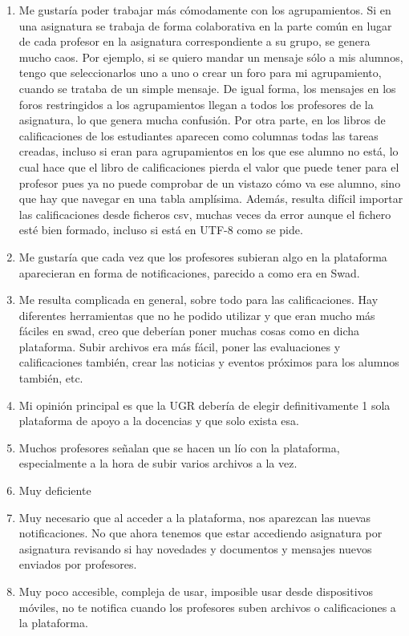 \begin{enumerate}
\item Me gustaría poder trabajar más cómodamente con los agrupamientos. Si en una asignatura se trabaja de forma colaborativa en la parte común en lugar de cada profesor en la asignatura correspondiente a su grupo, se genera mucho caos. Por ejemplo, si se quiero mandar un mensaje sólo a mis alumnos, tengo que seleccionarlos uno a uno o crear un foro para mi agrupamiento, cuando se trataba de un simple mensaje. De igual forma, los mensajes en los foros restringidos a los agrupamientos llegan a todos los profesores de la asignatura, lo que genera mucha confusión. Por otra parte, en los libros de calificaciones de los estudiantes aparecen como columnas todas las tareas creadas, incluso si eran para agrupamientos en los que ese alumno no está, lo cual hace que el libro de calificaciones pierda el valor que puede tener para el profesor pues ya no puede comprobar de un vistazo cómo va ese alumno, sino que hay que navegar en una tabla amplísima. Además, resulta difícil importar las calificaciones desde ficheros csv, muchas veces da error aunque el fichero esté bien formado, incluso si está en UTF-8 como se pide.
\item Me gustaría que cada vez que los profesores subieran algo en la plataforma aparecieran en forma de notificaciones, parecido a como era en Swad.
\item Me resulta complicada en general, sobre todo para las calificaciones. Hay diferentes herramientas que no he podido utilizar y que eran mucho más fáciles en swad, creo que deberían poner muchas cosas como en dicha plataforma. Subir archivos era más fácil, poner las evaluaciones y calificaciones también, crear las noticias y eventos próximos para los alumnos también, etc.
\item Mi opinión principal es que la UGR debería de elegir definitivamente 1 sola plataforma de apoyo a la docencias y que solo exista esa.
\item Muchos profesores señalan que se hacen un lío con la plataforma, especialmente a la hora de subir varios archivos a la vez.
\item Muy deficiente
\item Muy necesario que al acceder a la plataforma, nos aparezcan las nuevas notificaciones. No que ahora tenemos que estar accediendo asignatura por asignatura revisando si hay novedades y documentos y mensajes nuevos enviados por profesores.
\item Muy poco accesible, compleja de usar, imposible usar desde dispositivos móviles, no te notifica cuando los profesores suben archivos o calificaciones a la plataforma.

\end{enumerate}
